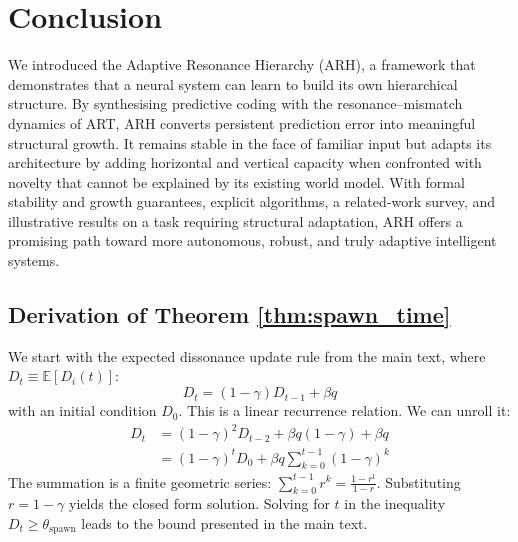 \documentclass{article}
\begin{document}
\section{Conclusion}
We introduced the Adaptive Resonance Hierarchy (ARH), a framework that demonstrates that a neural system can learn to build its own hierarchical structure.  By synthesising predictive coding with the resonance–mismatch dynamics of ART, ARH converts persistent prediction error into meaningful structural growth.  It remains stable in the face of familiar input but adapts its architecture by adding horizontal and vertical capacity when confronted with novelty that cannot be explained by its existing world model.  With formal stability and growth guarantees, explicit algorithms, a related‑work survey, and illustrative results on a task requiring structural adaptation, ARH offers a promising path toward more autonomous, robust, and truly adaptive intelligent systems.




\newpage
\begin{appendices}

\section{Derivation of Theorem \ref{thm:spawn_time}}
We start with the expected dissonance update rule from the main text, where $D_t \equiv \mathbb{E}[D_i(t)]$:
\begin{equation}
D_t = (1-\gamma)D_{t-1} + \beta q
\end{equation}
with an initial condition $D_0$.  This is a linear recurrence relation.  We can unroll it:
\begin{align*}
D_t &= (1-\gamma)^2 D_{t-2} + \beta q (1-\gamma) + \beta q \\[-1ex]
    &= (1-\gamma)^t D_0 + \beta q \sum_{k=0}^{t-1} (1-\gamma)^k
\end{align*}
The summation is a finite geometric series: $\sum_{k=0}^{t-1} r^k = \frac{1-r^t}{1-r}$.  Substituting $r = 1-\gamma$ yields the closed form solution.  Solving for $t$ in the inequality $D_t \ge \theta_{\text{spawn}}$ leads to the bound presented in the main text.

\end{appendices}
\end{document}
